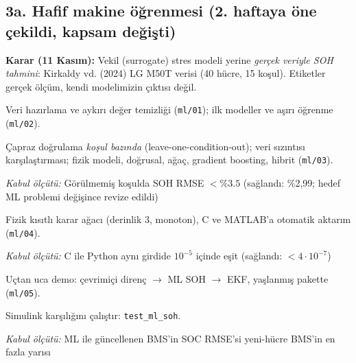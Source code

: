 \documentclass[11pt,a4paper]{article}
\newcommand{\kabul}[1]{\par{\small\textit{Kabul ölçütü:} #1}}
\begin{document}
\subsection*{3a. Hafif makine öğrenmesi (2. haftaya öne çekildi, kapsam değişti)}
\textbf{Karar (11 Kasım):} Vekil (surrogate) stres modeli yerine \emph{gerçek veriyle SOH tahmini}: Kirkaldy vd. (2024) LG M50T verisi (40 hücre, 15 koşul). Etiketler gerçek ölçüm, kendi modelimizin çıktısı değil.
\begin{gorev}
  \item[$\boxtimes$] Veri hazırlama ve aykırı değer temizliği (\texttt{ml/01}); ilk modeller ve aşırı öğrenme (\texttt{ml/02}).
  \item[$\boxtimes$] Çapraz doğrulama \emph{koşul bazında} (leave-one-condition-out); veri sızıntısı karşılaştırması; fizik modeli, doğrusal, ağaç, gradient boosting, hibrit (\texttt{ml/03}).
  \kabul{Görülmemiş koşulda SOH RMSE $<\%3.5$ (sağlandı: \%2,99; hedef ML problemi değişince revize edildi)}
  \item[$\boxtimes$] Fizik kısıtlı karar ağacı (derinlik 3, monoton), C ve MATLAB'a otomatik aktarım (\texttt{ml/04}).
  \kabul{C ile Python aynı girdide $10^{-5}$ içinde eşit (sağlandı: $<4\cdot10^{-7}$)}
  \item[$\boxtimes$] Uçtan uca demo: çevrimiçi direnç $\rightarrow$ ML SOH $\rightarrow$ EKF, yaşlanmış pakette (\texttt{ml/05}).
  \item Simulink karşılığını çalıştır: \texttt{test\_ml\_soh}.
  \kabul{ML ile güncellenen BMS'in SOC RMSE'si yeni-hücre BMS'in en fazla yarısı}
\end{gorev}
\end{document}
